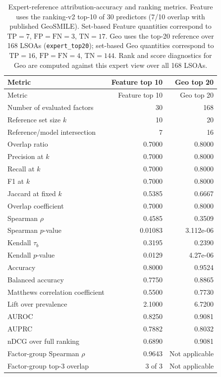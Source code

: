 \begin{longtable}{p{} r r}
\caption{Expert-reference attribution-accuracy and ranking metrics. Feature uses the ranking-v2 top-10 of 30 predictors (7/10 overlap with published GeoSMILE). Set-based Feature quantities correspond to $\mathrm{TP}=7$, $\mathrm{FP}=\mathrm{FN}=3$, $\mathrm{TN}=17$. Geo uses the top-20 reference over 168 LSOAs (\texttt{expert\_top20}); set-based Geo quantities correspond to $\mathrm{TP}=16$, $\mathrm{FP}=\mathrm{FN}=4$, $\mathrm{TN}=144$. Rank and score diagnostics for Geo are computed against this expert view over all 168 LSOAs.}
\label{tab:hull_expert_att_final}\\
\toprule
Metric & Feature top 10 & Geo top 20 \\
\midrule
\endfirsthead
\toprule
Metric & Feature top 10 & Geo top 20 \\
\midrule
\endhead
Number of evaluated factors & 30 & 168 \\
Reference set size $k$ & 10 & 20 \\
Reference/model intersection & 7 & 16 \\
Overlap ratio & 0.7000 & 0.8000 \\
Precision at $k$ & 0.7000 & 0.8000 \\
Recall at $k$ & 0.7000 & 0.8000 \\
F1 at $k$ & 0.7000 & 0.8000 \\
Jaccard at fixed $k$ & 0.5385 & 0.6667 \\
Overlap coefficient & 0.7000 & 0.8000 \\
Spearman $\rho$ & 0.4585 & 0.3509 \\
Spearman $p$-value & 0.01083 & 3.112e-06 \\
Kendall $\tau_b$ & 0.3195 & 0.2390 \\
Kendall $p$-value & 0.0129 & 4.27e-06 \\
Accuracy & 0.8000 & 0.9524 \\
Balanced accuracy & 0.7750 & 0.8865 \\
Matthews correlation coefficient & 0.5500 & 0.7730 \\
Lift over prevalence & 2.1000 & 6.7200 \\
AUROC & 0.8250 & 0.9081 \\
AUPRC & 0.7882 & 0.8032 \\
nDCG over full ranking & 0.6890 & 0.9081 \\
Factor-group Spearman $\rho$ & 0.9643 & Not applicable \\
Factor-group top-3 overlap & 3 of 3 & Not applicable \\
\bottomrule
\end{longtable}

